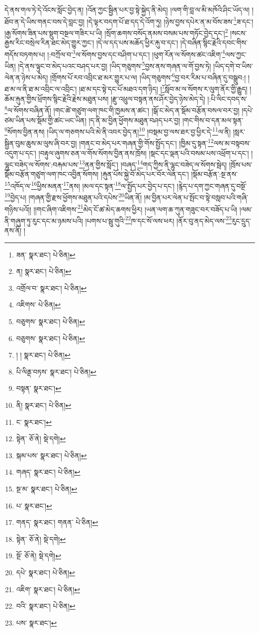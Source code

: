 དེ་ནས་གལ་ཏེ་དེ་འོངས་སློང་བྱེད་ན། །འོན་ཀྱང་སྦྱིན་པར་བྱ་སྟེ་སྐྱེད་ནི་མེད། །ལག་གི་བླ་ལ་མི་མཁོའི་ཤིང་ཡོད་ལ། །ཐོབ་ན་དེ་ཡིས་གནང་བས་དེ་བླང་བྱ། །དེ་ལྟར་བདག་པོ་ཐ་དད་དེ་འོག་ཏུ། །ཉེས་བྱས་དཔེར་ན་མ་བོས་ཟས་\footnote{ཟན་  སྣར་ཐང་།  པེ་ཅིན། }ཟ་དང་། །རྒྱ་སོགས་ཟིན་པས་སྡུག་བསྔལ་གཟིར་པ་ཡི། །སྲོག་ཆགས་བསོད་ནམས་བསམ་པས་གཏོང་བྱེད་དང་།\footnote{ན།  སྣར་ཐང་།  པེ་ཅིན། } །སངས་རྒྱས་རིང་བསྲེལ་རིན་ཐང་མེད་གྱུར་ཀྱང་། །དེ་ལ་དད་པས་མཆོད་ཕྱིར་རྐུ་བ་དང་། །དེ་བཞིན་སྙིང་རྗེའི་དབང་གིས་གདོས་བཏགས་པ། །:བཀྲོལ་བ་\footnote{འགྲོལ་བ་  སྣར་ཐང་།  པེ་ཅིན། }ལ་སོགས་བྱས་དང་བཤིག་པ་དང་། །ཕུག་རོན་ལ་སོགས་ཚང་འཇིག་\footnote{འཇིགས་  པེ་ཅིན། }ལས་ཀྱང་ཡིན། །དེ་ནས་ལྟུང་བ་མེད་པའང་བཤད་པར་བྱ། །ཡིད་གཅུགས་\footnote{བཅུགས་  སྣར་ཐང་།  པེ་ཅིན། }བྱས་ནས་གཞན་ལ་གོ་བྱས་ཏེ། །ཡིད་དགེ་བ་ཡིས་ལེན་ན་ཉེས་པ་མེད། །གྲོགས་པོ་རབ་འབྲིང་ཐ་མར་གྱུར་པ་ལ། །ཡིད་གཅུགས་\footnote{བཅུགས་  སྣར་ཐང་།  པེ་ཅིན། }བྱ་བར་རིམ་པ་བཞིན་དུ་བསྒྲུབ:། །ཐ་མ་ལ་ནི་ཐ་མ་འབྲིང་ལ་འབྲིང་། །ཐ་མ་དང་སྟེ་དང་པོ་མཐའ་དག་ཉིད། །\footnote{། །  སྣར་ཐང་།  པེ་ཅིན། }སློབ་མ་ལ་སོགས་ར་ལུག་ནོར་གྱི་རྒྱུད། །ཆོམ་རྐུན་གྱིས་ཕྲོགས་སྙིང་རྗེའི་རྗེས་མཐུན་པས། །རྫུ་འཕྲུལ་བསྟན་ནས་ཤོར་བྱེད་ཉེས་མེད་དེ། །:པི་ལིང་དབད་ས་\footnote{པི་ལིནྡ་བཏས་  སྣར་ཐང་།  པེ་ཅིན། }ལ་སོགས་བཞིན་ནོ། །གང་ཚེ་གཙུག་ལག་ཁང་གི་ཁྱམས་ན་ཚང་། །སྒོ་ང་མེད་ན་སྡོམ་བརྩོན་བསལ་བར་བྱ། །དཔེ་ཙམ་ཡིན་པས་སྡོམ་གྱི་ཚང་ཡང་ཡིན། །ད་ནི་མ་བྱིན་ཕྱོགས་མཐུན་བཤད་པར་བྱ། །གང་གིས་བ་དན་མལ་སྟན་\footnote{བསྟན་  སྣར་ཐང་། }སོགས་བྱིན་ནས། །ཡིད་ལ་གཅགས་པའི་མེ་ནི་འབར་བྱེད་ན།\footnote{ནི།  སྣར་ཐང་།  པེ་ཅིན། } །བསྡམ་བྱ་ལས་ཐར་བྱ་ཕྱིར་དེ་\footnote{ང་  སྣར་ཐང་། }ལ་ནི། །སླར་སྦྱིན་བུམ་ཆུས་མ་ལུས་ཞི་བར་བྱ། །གནང་བ་མེད་པར་གཞན་གྱི་གོས་སྤྱོད་དང་། །ཁྱིམ་དུ་སྟན་\footnote{སྟེན་  ཅོ་ནེ།  སྡེ་དགེ། }ལས་མ་བསྟབས་འདུག་པ་དང་། །བརྟུལ་ཞུགས་ཅན་ལ་གོས་སོགས་བྱིན་ནས་ཁྲོས། །སྡང་དང་ལྡན་པའི་བསམ་པས་འཕྲོག་པ་དང་། །ལྷུང་བཟེད་ལ་སོགས་:བརྐམ་པས་\footnote{སྐམ་པས་  སྣར་ཐང་།  པེ་ཅིན། }ནན་གྱིས་སློང་། །བཞད་\footnote{གཞད་  སྣར་ཐང་།  པེ་ཅིན། }གད་ཀྱིས་ནི་ལྷུང་བཟེད་ལ་སོགས་སྦེད། །ཁྲོས་པས་སྡོམ་བརྩོན་གཙུག་ལག་ཁང་འབྱིན་སོགས། །རྐུན་པོས་སྐྱེ་བོ་མེད་པར་བོར་ལེན་དང་། །སྡོམ་བརྩོན་:སྔ་ནས་\footnote{སྔ་མ་  སྣར་ཐང་།  པེ་ཅིན། }འཁོད་ལ་\footnote{པ་  སྣར་ཐང་། }ཕྱིས་མནན་\footnote{གནད་  སྣར་ཐང་། གནན་  པེ་ཅིན། }ནས། །མལ་དང་སྟན་\footnote{སྟེན་  ཅོ་ནེ།  སྡེ་དགེ། }ལ་སྤྱོད་པར་བྱེད་པ་དང་། །རྙེད་པ་དག་ཀྱང་གཞན་དུ་བསྔོ་\footnote{སྔོ་  ཅོ་ནེ།  སྡེ་དགེ། }བྱེད་པ། །གཞན་གྱི་རྫས་ཕྱོགས་མཐུན་པའི་དཔེས་\footnote{དཔེ་  སྣར་ཐང་།  པེ་ཅིན། }ཡིན་ནོ། །མ་བྱིན་པར་ལེན་པ་སྤོང་བ་སྟེ་བསླབ་པའི་གཞི་གཉིས་པའོ།། །།གང་ཞིག་འཇིགས་\footnote{འཇིག་  སྣར་ཐང་།  པེ་ཅིན། }མེད་ངོ་ཚ་མེད་ཆགས་ཕྱིར། །ཡན་ལག་ཆ་ཀུན་གཟུང་བར་བཟོད་པ་ཡི། །ལམ་ནི་གཞུག་ཏུ་རུང་དང་མ་ཉམས་པའི། །པགས་པ་སྦུ་གུའི་\footnote{བའི་  སྣར་ཐང་།  པེ་ཅིན། }ཁ་དང་སོ་ལས་ཕར། །ནོར་བུ་ནད་མེད་ལས་\footnote{པས་  སྣར་ཐང་། }རུང་དྲུད་ནས་ནི། །
